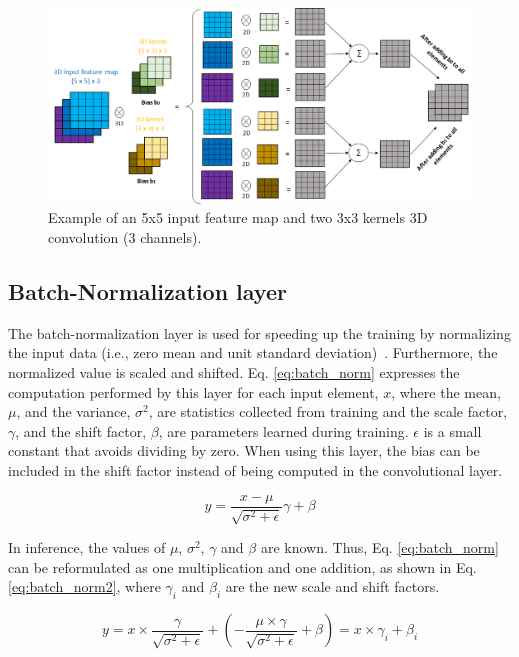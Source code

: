 \begin{figure}[!htb]
  \centering
  \includegraphics[width=\textwidth]{Figures/3D_conv.png}
  \caption{Example of an 5x5 input feature map and two 3x3 kernels 3D convolution (3 channels).}
  \label{fig:3D_conv}
\end{figure}
\vspace{-5mm}

\subsection{Batch-Normalization layer}

The batch-normalization layer is used for speeding up the training by normalizing the input data (i.e., zero mean and unit standard deviation)~\cite{Abdelouahab:dnn_survey}. Furthermore, the normalized value is scaled and shifted. Eq. \ref{eq:batch_norm} expresses the computation performed by this layer for each input element, $x$, where the mean, $\mu$, and the variance, $\sigma^2$, are statistics collected from training and the scale factor, $\gamma$, and the shift factor, $\beta$, are parameters learned during training. $\epsilon$ is a small constant that avoids dividing by zero. When using this layer, the bias can be included in the shift factor instead of being computed in the convolutional layer.

\begin{equation}
  y = \frac{x-\mu}{\sqrt{\sigma^2+\epsilon}} \gamma + \beta
\label{eq:batch_norm}
\end{equation}

In inference, the values of $\mu$, $\sigma^2$, $\gamma$ and $\beta$ are known. Thus, Eq. \ref{eq:batch_norm} can be reformulated as one multiplication and one addition, as shown in Eq. \ref{eq:batch_norm2}, where $\gamma_i$ and $\beta_i$ are the new scale and shift factors.

\begin{equation}
  y = x \times \frac{\gamma}{\sqrt{\sigma^2+\epsilon}} + \left( - \frac{\mu \times \gamma}{\sqrt{\sigma^2+\epsilon}} + \beta \right) = x \times \gamma_i + \beta_i
\label{eq:batch_norm2}
\end{equation}

